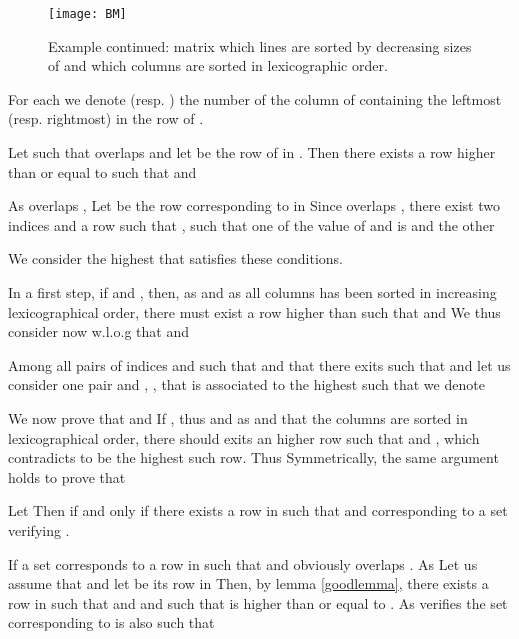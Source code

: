 \documentclass{llncs}
\begin{document}
\begin{figure}[htb]
\vspace{-0.3cm}
  \centering
\texttt{[image: BM]}
\caption{Example continued:  matrix which lines are sorted by
decreasing sizes of  and which columns are sorted in lexicographic order.}
 \label{matrix}
\vspace{-0.3cm}
\end{figure}

For each  we denote 
(resp. ) the number of the column of  containing the
leftmost (resp. rightmost)  in the row of .

\begin{lemma}
 Let  such that  overlaps  and let  be the
 row of  in . Then there exists a row  higher than or equal
 to  such that  and
 
\label{goodlemma}
\end{lemma}
\begin{preuve}
 As  overlaps ,  Let  be the row
 corresponding to  in  Since  overlaps , there
 exist two indices  and a row  such that
 , such that one of the value of
  and  is  and the other 

We consider the highest  that satisfies these conditions.

In a first step, if  and , then, as 
and as all columns has been sorted in increasing lexicographical
order, there must exist a row  higher than  such that
 and  We thus consider now
w.l.o.g that  and 

Among all pairs of indices  and  such that
 and that there exits  such
that  and  let us consider one
pair  and , , that is associated to the
highest such  that we denote 

We now prove that  and
 If  ,
thus  and as  and that the columns
are sorted in lexicographical order, there should exits an higher row
 such that  and
, which contradicts  to be the
highest such row. Thus  Symmetrically,
the same argument holds to prove that

\end{preuve}


\begin{lemma}
 Let  Then  if and only if
 there exists a row  in  such that
  and 
 corresponding to a set  verifying . 
\label{uplemma}
\end{lemma}
\begin{preuve}
 If a set  corresponds to a row  in  such
  that  and
    obviously overlaps . As
      Let us
  assume that  and let  be its row in
   Then, by lemma \ref{goodlemma}, there exists a row  in 
  such that  and
   and such that  is higher than or
  equal to . As  verifies  the set  corresponding to  is also such that 
\end{preuve}
\end{document}
